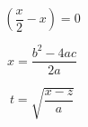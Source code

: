 \documentclass[11pt]{article}
\begin{document}
$$\left ( \frac{x}{2} - x \right)=0$$

$$x = \frac{b^2-4ac}{2a} $$

$$t = \sqrt{\frac{x-z}{a}}$$
\end{document}
